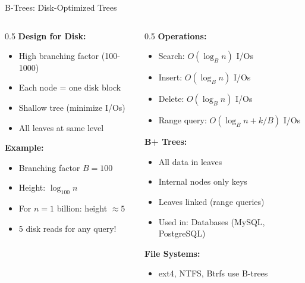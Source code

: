 \documentclass[aspectratio=169,xcolor=dvipsnames]{beamer}
\begin{document}
\begin{frame}{B-Trees: Disk-Optimized Trees}
  \begin{columns}
    \begin{column}{0.5\textwidth}
      \textbf{Design for Disk:}
      \begin{itemize}
        \item High branching factor (100-1000)
        \item Each node = one disk block
        \item Shallow tree (minimize I/Os)
        \item All leaves at same level
      \end{itemize}

      \vspace{0.3cm}
      \textbf{Example:}
      \begin{itemize}
        \item Branching factor $B = 100$
        \item Height: $\log_{100} n$
        \item For $n = 1$ billion: height $\approx 5$
        \item 5 disk reads for any query!
      \end{itemize}
    \end{column}

    \begin{column}{0.5\textwidth}
      \textbf{Operations:}
      \begin{itemize}
        \item Search: $O(\log_B n)$ I/Os
        \item Insert: $O(\log_B n)$ I/Os
        \item Delete: $O(\log_B n)$ I/Os
        \item Range query: $O(\log_B n + k/B)$ I/Os
      \end{itemize}

      \vspace{0.3cm}
      \textbf{B+ Trees:}
      \begin{itemize}
        \item All data in leaves
        \item Internal nodes only keys
        \item Leaves linked (range queries)
        \item Used in: Databases (MySQL, PostgreSQL)
      \end{itemize}

      \vspace{0.3cm}
      \textbf{File Systems:}
      \begin{itemize}
        \item ext4, NTFS, Btrfs use B-trees
      \end{itemize}
    \end{column}
  \end{columns}
\end{frame}
\end{document}
